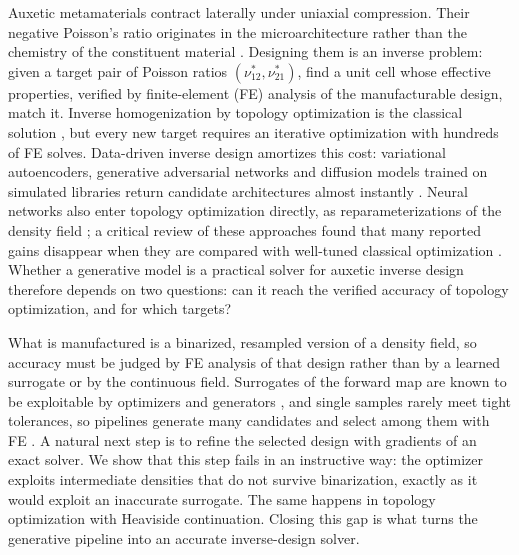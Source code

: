 \documentclass[a4paper,11pt]{article}
\newcommand{\nuot}{\nu_{12}}
\newcommand{\nuto}{\nu_{21}}
\begin{document}
Auxetic metamaterials contract laterally under uniaxial compression. Their
negative Poisson's ratio originates in the microarchitecture rather than the
chemistry of the constituent material
\citep{lakes1987foam,evans2000auxetic,bertoldi2017flexible}. Designing them
is an inverse problem: given a target pair of Poisson ratios
$(\nuot^{*},\nuto^{*})$, find a unit cell whose effective properties,
verified by finite-element (FE) analysis of the manufacturable design, match
it. Inverse homogenization by topology optimization is the classical
solution \citep{sigmund1994materials,larsen1997design,bendsoe2003topology},
but every new target requires an iterative optimization with hundreds of FE
solves. Data-driven inverse design amortizes this cost: variational
autoencoders, generative adversarial networks and diffusion models trained on
simulated libraries return candidate architectures almost instantly
\citep{wang2020deep,mao2020gan,kumar2020spinodoid,bastek2022inverting,kollmann2020deep,zheng2021controllable,pahlavani2024deep,bastek2023diffusion}.
Neural networks also enter topology optimization directly, as
reparameterizations of the density field
\citep{hoyer2019neural,chandrasekhar2021tounn}; a critical review of these
approaches found that many reported gains disappear when they are compared
with well-tuned classical optimization \citep{woldseth2022use}. Whether a
generative model is a practical solver for auxetic inverse design therefore
depends on two questions: can it reach the verified accuracy of topology
optimization, and for which targets?

What is manufactured is a binarized, resampled version of a density field,
so accuracy must be judged by FE analysis of that design rather than by a
learned surrogate or by the continuous field. Surrogates of the forward map
are known to be exploitable by optimizers and generators
\citep{trabucco2021coms}, and single samples rarely meet tight tolerances, so
pipelines generate many candidates and select among them with FE
\citep{pahlavani2024deep}. A natural next step is to refine the selected
design with gradients of an exact solver. We show that this step fails in an
instructive way: the optimizer exploits intermediate densities that do not
survive binarization, exactly as it would exploit an inaccurate surrogate.
The same happens in topology optimization with Heaviside continuation.
Closing this gap is what turns the generative pipeline into an accurate
inverse-design solver.
\end{document}
